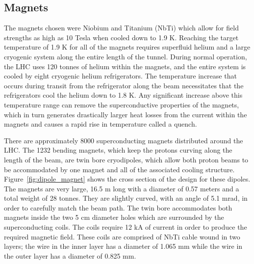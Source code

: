 \subsection{Magnets}

The magnets chosen were Niobium and Titanium (NbTi) which allow for field strengths as high as 10 Tesla when cooled down to 1.9 K.
Reaching the target temperature of  1.9 K for all of the magnets requires superfluid helium and a large cryogenic system along the entire length of the tunnel.
During normal operation, the \ac{LHC} uses 120 tonnes of helium within the magnets, and the entire system is cooled by eight cryogenic helium refrigerators.
The temperature increase that occurs during transit from the refrigerator along the beam necessitates that the refrigerators cool the helium down to 1.8 K.
Any significant increase above this temperature range can remove the superconductive properties of the magnets, which in turn generates drastically larger heat losses from the current within the magnets and causes a rapid rise in temperature called a quench.

There are approximately 8000 superconducting magnets distributed around the \ac{LHC}.
The 1232 bending magnets, which keep the protons curving along the length of the beam, are twin bore cryodipoles, which allow both proton beams to be accommodated by one magnet and all of the associated cooling structure.
Figure~\ref{fig:dipole_magnet} shows the cross section of the design for these dipoles. 
The magnets are very large, 16.5 m long with a diameter of 0.57 meters and a total weight of 28 tonnes. 
They are slightly curved, with an angle of 5.1 mrad, in order to carefully match the beam path.
The twin bore accommodates both magnets inside the two 5 cm diameter holes which are surrounded by the superconducting coils.
The coils require 12 kA of current in order to produce the required magnetic field.
These coils are comprised of NbTi cable wound in two layers; the wire in the inner layer has a diameter of 1.065 mm while the wire in the outer layer has a diameter of 0.825 mm. 

